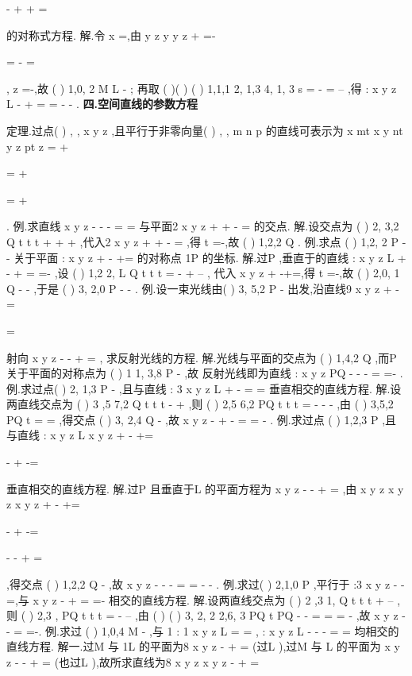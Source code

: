 -
+
+
=

的对称式方程. 
解.令
x =,由
y
z
y
y
z
+
=-

\Rightarrow 
=
-
=

,
z =-,故
(
)
1,0, 2
M
L
-
\in 
; 
再取
(
)(
)
(
)
1,1,1
2, 1,3
4, 1, 3
s =
\times 
-
=
--
\rho 
,得
:
x
y
z
L
-
+
=
=
-
-
. 
\vspace{4pt}
{\bfseries \textcolor{lyred}{四.空间直线的参数方程}}

\textcolor{lyred}{定理}.过点(
)
,
,
x
y z
,且平行于非零向量(
)
, ,
m n p 的直线可表示为
x
mt
x
y
nt
y
z
pt
z
=
+


=
+

=
+

. 
\textcolor{lyred}{例}.求直线
x
y
z
-
-
-
=
=
与平面2
x
y
z
+
+
-
=
的交点. 
解.设交点为
(
)
2,
3,2
Q t
t
t
+
+
+
,代入2
x
y
z
+
+
-
=
,得
t =-,故
(
)
1,2,2
Q
. 
\textcolor{lyred}{例}.求点
(
)
1,2, 2
P -
-
关于平面
:
x
y
z
\Pi 
+
-
+=
的对称点
1P 的坐标. 
解.过P ,垂直于\Pi 的直线
:
x
y
z
L
+
-
+
=
=-
,设
(
)
1,2
2,
L
Q t
t
t
\cap \Pi =
-
+
--
, 
代入
x
y
z
+
-+=,得
t =-,故
(
)
2,0, 1
Q -
-
,于是
(
)
3, 2,0
P -
-
. 
\textcolor{lyred}{例}.设一束光线由(
)
3, 5,2
P
-
出发,沿直线9
x
y
z
+
-
=

=

射向
x
y
z
-
-
+
=
, 
求反射光线的方程. 
解.光线与平面的交点为
(
)
1,4,2
Q
,而P 关于平面的对称点为
(
)
1 1, 3,8
P
-
,故 
反射光线即为直线
:
x
y
z
PQ
-
-
-
=
=-
. 
\textcolor{lyred}{例}.求过点(
)
2, 1,3
P
-
,且与直线
: 3
x
y
z
L
+
-
=
=
垂直相交的直线方程. 
解.设两直线交点为
(
)
3 ,5
7,2
Q
t
t
t
-
+
,则
(
)
2,5
6,2
PQ
t
t
t
=
-
-
-
\xi \xi \xi \rho 
,由 
(
)
3,5,2
PQ
t
\cdots 
=
\Rightarrow =
\xi \xi \xi \rho 
,得交点
(
)
3, 2,4
Q
-
,故
x
y
z
-
+
-
=
=
-
. 
\textcolor{lyred}{例}.求过点
(
)
1,2,3
P
,且与直线
:
x
y
z
L
x
y
z
+
-
+=

-
+
-=

垂直相交的直线方程. 
解.过P 且垂直于L 的平面方程为
x
y
z
-
-
+
=
,由 
x
y
z
x
y
z
x
y
z
+
-
+=

-
+
-=

-
-
+
=

,得交点
(
)
1,2,2
Q -
,故
x
y
z
-
-
-
=
=
-
-
. 
\textcolor{lyred}{例}.求过(
)
2,1,0
P
,平行于
:3
x
y
z
\Pi 
-
-
=,与
x
y
z
-
+
=
=-
相交的直线方程. 
解.设两直线交点为
(
)
2 ,3
1,
Q
t
t
t
+
--
,则
(
)
2,3 ,
PQ
t
t
t
=
-
--
\xi \xi \xi \rho 
,由 
(
)
(
)
3, 2, 2
2,6, 3
PQ
t
PQ
\cdots 
-
-
=
\Rightarrow =
\Rightarrow 
=
-
\xi \xi \xi \rho 
\xi \xi \xi \rho 
,故
x
y
z
-
-
=
=-. 
\textcolor{lyred}{例}.求过
(
)
1,0,4
M -
,与
1 : 1
x
y
z
L
=
=
,
:
x
y
z
L
-
-
-
=
=
均相交的直线方程. 
解一.过M 与
1L 的平面为8
x
y
z
-
+
=
(过L ),过M 与
L 的平面为 
x
y
z
-
-
+
=
(也过L ),故所求直线为8
x
y
z
x
y
z
-
+
=



